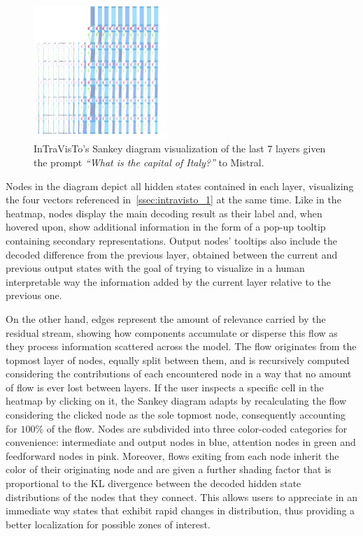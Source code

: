 \documentclass[11pt,a4paper,twocolumn]{article}
\begin{document}
\begin{figure}[h!]
    \centering
    \includegraphics[width=0.45\textwidth]{exp_intravisto_2A_sankey.png}
    \caption{InTraVisTo's Sankey diagram visualization of the last 7 layers given the prompt \emph{``What is the capital of Italy?''} to Mistral.}
    \label{fig:exp_intravisto_2_A}
\end{figure}

\vspace{-10pt}

Nodes in the diagram depict all hidden states contained in each layer, visualizing the four vectors referenced in~\cref{ssec:intravisto_1} at the same time.
Like in the heatmap, nodes display the main decoding result as their label and, when hovered upon, show additional information in the form of a pop-up tooltip containing secondary representations.
Output nodes' tooltips also include the decoded difference from the previous layer, obtained between the current and previous output states with the goal of trying to visualize in a human interpretable way the information added by the current layer relative to the previous one.

On the other hand, edges represent the amount of relevance carried by the residual stream, showing how components accumulate or disperse this flow as they process information scattered across the model.
The flow originates from the topmost layer of nodes, equally split between them, and is recursively computed considering the contributions of each encountered node in a way that no amount of flow is ever lost between layers.
If the user inspects a specific cell in the heatmap by clicking on it, the Sankey diagram adapts by recalculating the flow considering the clicked node as the sole topmost node, consequently accounting for $100\%$ of the flow.
Nodes are subdivided into three color-coded categories for convenience: intermediate and output nodes in blue, attention nodes in green and feedforward nodes in pink.
Moreover, flows exiting from each node inherit the color of their originating node and are given a further shading factor that is proportional to the KL divergence between the decoded hidden state distributions of the nodes that they connect.
This allows users to appreciate in an immediate way states that exhibit rapid changes in distribution, thus providing a better localization for possible zones of interest.
\end{document}
